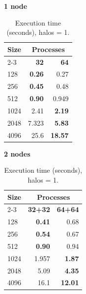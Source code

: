 \begin{table}[H]
\centering
\begin{minipage}[t]{0.48\textwidth}
\centering
\textbf{1 node}\\
\begin{tabular}{l|rr}
\hline
\textbf{Size} & \multicolumn{2}{c}{\textbf{Processes}} \\
\cline{2-3}
 & \textbf{32} & \textbf{64} \\
\hline
128 & \textbf{0.26} & 0.27 \\
256 & \textbf{0.45} & 0.48 \\
512 & \textbf{0.90} & 0.949 \\
1024 & 2.41 & \textbf{2.19} \\
2048 & 7.323 & \textbf{5.83} \\
4096 & 25.6 & \textbf{18.57} \\
\hline
\end{tabular}
\end{minipage}
\hfill
\begin{minipage}[t]{0.48\textwidth}
\centering
\textbf{2 nodes}\\
\begin{tabular}{l|rr}
\hline
\textbf{Size} & \multicolumn{2}{c}{\textbf{Processes}} \\
\cline{2-3}
 & \textbf{32+32} & \textbf{64+64} \\
\hline
128 & \textbf{0.41} & 0.68 \\
256 & \textbf{0.54} & 0.67 \\
512 & \textbf{0.90} & 0.94 \\
1024 & 1.957 & \textbf{1.87} \\
2048 & 5.09 & \textbf{4.35} \\
4096 & 16.1 & \textbf{12.01} \\
\hline
\end{tabular}
\end{minipage}
\caption{Execution time (seconds), halos = 1.}
\end{table}

